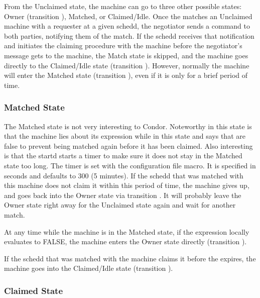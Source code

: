 From the Unclaimed state, the machine can go to three other possible
states: Owner (transition ), Matched, or Claimed/Idle.
Once the  matches an Unclaimed machine with a
requester at a given schedd, the negotiator sends a command to both
parties, notifying them of the match.  
If the schedd receives that notification and initiates the claiming
procedure with the machine before the negotiator's message gets to the
machine, the Match state is skipped,
and the machine goes
directly to the Claimed/Idle state (transition ).
However, normally the machine will enter the Matched state (transition
), even if it is only for a brief period of time.

\subsubsection{\label{sec:Matched-State}Matched State}

The Matched state is not very interesting to Condor.
Noteworthy in this state is that the machine lies about its 
expression while in this state and says that  are
false to prevent being matched again before it has been claimed.
Also interesting is that
the startd starts a timer to make sure it does not stay in the
Matched state too long.
The timer is set with the 
\label{param:MatchTimeout} configuration file macro.
It is specified in seconds and defaults to 300 (5 minutes).
If the schedd that was matched with this machine does not
claim it within this period of time, the machine gives up,
and goes back into the Owner state via transition .
It will probably leave the Owner state right away for the
Unclaimed state again and wait for another match. 

At any time while the machine is in the Matched state, if the
 expression locally evaluates to FALSE, the machine enters
the Owner state directly (transition ).

If the schedd that was matched with the machine claims it before the
 expires, the machine goes into the Claimed/Idle
state (transition ).

\subsubsection{\label{sec:Claimed-State}Claimed State}

